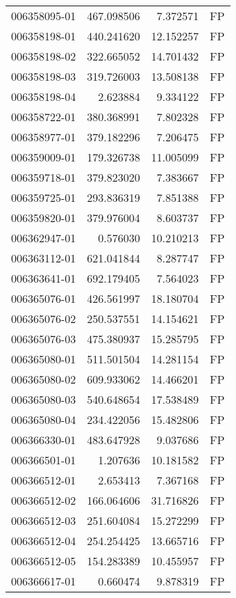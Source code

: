 \begin{tabular}{lrrl}
006358095-01 &  467.098506 &     7.372571 &   FP \\
006358198-01 &  440.241620 &    12.152257 &   FP \\
006358198-02 &  322.665052 &    14.701432 &   FP \\
006358198-03 &  319.726003 &    13.508138 &   FP \\
006358198-04 &    2.623884 &     9.334122 &   FP \\
006358722-01 &  380.368991 &     7.802328 &   FP \\
006358977-01 &  379.182296 &     7.206475 &   FP \\
006359009-01 &  179.326738 &    11.005099 &   FP \\
006359718-01 &  379.823020 &     7.383667 &   FP \\
006359725-01 &  293.836319 &     7.851388 &   FP \\
006359820-01 &  379.976004 &     8.603737 &   FP \\
006362947-01 &    0.576030 &    10.210213 &   FP \\
006363112-01 &  621.041844 &     8.287747 &   FP \\
006363641-01 &  692.179405 &     7.564023 &   FP \\
006365076-01 &  426.561997 &    18.180704 &   FP \\
006365076-02 &  250.537551 &    14.154621 &   FP \\
006365076-03 &  475.380937 &    15.285795 &   FP \\
006365080-01 &  511.501504 &    14.281154 &   FP \\
006365080-02 &  609.933062 &    14.466201 &   FP \\
006365080-03 &  540.648654 &    17.538489 &   FP \\
006365080-04 &  234.422056 &    15.482806 &   FP \\
006366330-01 &  483.647928 &     9.037686 &   FP \\
006366501-01 &    1.207636 &    10.181582 &   FP \\
006366512-01 &    2.653413 &     7.367168 &   FP \\
006366512-02 &  166.064606 &    31.716826 &   FP \\
006366512-03 &  251.604084 &    15.272299 &   FP \\
006366512-04 &  254.254425 &    13.665716 &   FP \\
006366512-05 &  154.283389 &    10.455957 &   FP \\
006366617-01 &    0.660474 &     9.878319 &   FP \\

\end{tabular}
